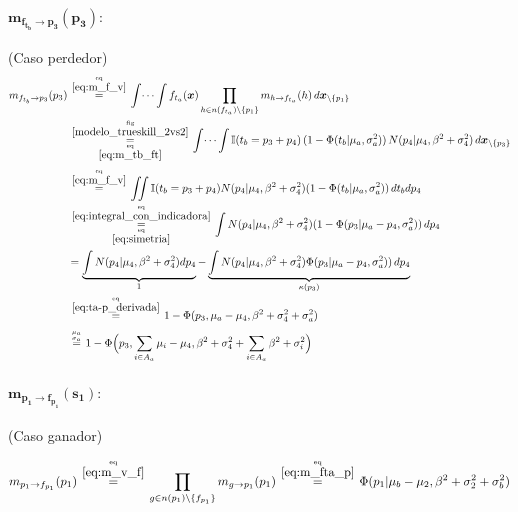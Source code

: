 \documentclass[article]{jss}
\newcommand\hfrac[2]{\genfrac{}{}{0pt}{}{#1}{#2}} %
\begin{document}
\begin{appendix}
\paragraph{$\bm{m_{f_{t_b} \rightarrow p_3}(p_3)}:$} (Caso perdedor)
\begin{equation}\label{eq:m_ftb_p}
\begin{split}
m_{f_{t_b} \rightarrow p_3}(p_3)&\overset{\hfrac{\text{eq}}{\ref{eq:m_f_v}}}{=} \int \dots \int f_{t_a}(\bm{x}) \prod_{h \in n(f_{t_a}) \setminus \{p_1\} } m_{h \rightarrow f_{t_a}}(h) \, d\bm{x}_{\setminus \{p_1\} }  \\
&\overset{\hfrac{\text{fig}}{\ref{modelo_trueskill_2vs2}}}{\underset{\hfrac{\text{eq}}{\ref{eq:m_tb_ft}}}{=}} \int \dots \int \mathbb{I}( t_b = p_3 + p_4) \, (1-\Phi (t_b| \mu_a , \sigma_a^2 )) \, N(p_4| \mu_4, \beta^2 + \sigma_4^2 ) \, d\bm{x}_{\setminus \{p_3\} }\\[0.1cm]
&\overset{\hfrac{\text{eq}}{\ref{eq:m_f_v}}}{=} \iint \mathbb{I}( t_b = p_3 + p_4) N(p_4| \mu_4, \beta^2 + \sigma_4^2 )  (1 - \Phi (t_b| \mu_a , \sigma_a^2) )\, dt_b dp_4 \\
&\overset{\hfrac{\text{eq}}{\ref{eq:integral_con_indicadora}}}{\underset{\hfrac{\text{eq}}{\ref{eq:simetria}}}{=}} \int N(p_4| \mu_4, \beta^2 + \sigma_4^2 )  (1 - \Phi (p_3 | \mu_a - p_4 , \sigma_a^2 ) ) \,  dp_4 \\
& =  \underbrace{\int N(p_4| \mu_4, \beta^2 + \sigma_4^2 )dp_4}_{1}  -  \underbrace{\int N(p_4| \mu_4, \beta^2 + \sigma_4^2 ) \Phi (p_3 | \mu_a - p_4 , \sigma_a^2 ) ) \, dp_4}_{\kappa(p_3)} \\
&\overset{\hfrac{\text{eq}}{\ref{eq:ta-p_derivada}}}{=} 1 - \Phi(p_3, \mu_a  - \mu_4, \beta^2 + \sigma_4^2 + \sigma_a^2)\\[0.1cm]
&\overset{\hfrac{\mu_a}{\sigma_a}}{=} 1 - \Phi\Big(p_3, \sum_{i \in A_a} \mu_i  - \mu_4, \beta^2 + \sigma_4^2 + \sum_{i \in A_a} \beta^2 + \sigma_i^2  \Big)
\end{split}
\end{equation}

\paragraph{$\bm{m_{p_1 \rightarrow f_{p_1}}(s_1)}:$} (Caso ganador)

\begin{equation}\label{eq:m_p1_fp}
\begin{split}
 m_{p_1 \rightarrow f_{p_1}}(p_1) \overset{\hfrac{\text{eq}}{\ref{eq:m_v_f}}}{=} \prod_{g \in n(p_1) \setminus  \{f_{p_1} \}} m_{g \rightarrow p_1} (p_1)  \overset{\hfrac{\text{eq}}{\ref{eq:m_fta_p}}}{=}  \Phi(p_1| \mu_b - \mu_2, \beta^2 + \sigma_2^2 + \sigma_b^2)
\end{split}
\end{equation}



\end{appendix}
\end{document}
